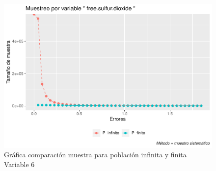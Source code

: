 \documentclass[
]{article}
\begin{document}
\begin{figure}
\centering
\includegraphics{1_examen_solucion_files/figure-latex/grafica sys6-1.pdf}
\caption{Gráfica comparación muestra para población infinita y finita
Variable 6}
\end{figure}
\end{document}
